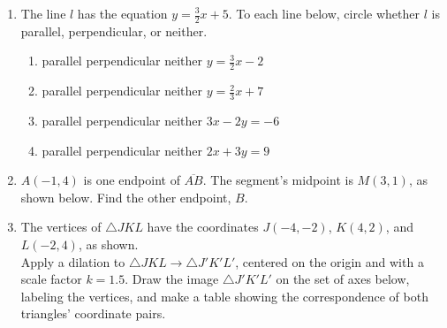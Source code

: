 \documentclass[12pt, twoside]{article}
\begin{document}
\begin{enumerate}
  \item The line $l$ has the equation $y=\frac{3}{2}x+5$. To each line below, circle whether $l$ is parallel, perpendicular, or neither.
    \begin{enumerate}
      \item parallel \quad perpendicular \quad neither \qquad $y=\frac{3}{2}x-2$
      \vspace{0.5cm}
      \item parallel \quad perpendicular \quad neither \qquad $y=\frac{2}{3}x+7$
      \vspace{0.5cm}
      \item parallel \quad perpendicular \quad neither \qquad $3x-2y=-6$
      \vspace{2cm}
      \item parallel \quad perpendicular \quad neither \qquad $2x+3y=9$
      \vspace{2cm}
    \end{enumerate}

  \item $A(-1,4)$ is one endpoint of $\overline{AB}$. The segment's midpoint is $M(3,1)$, as shown below. Find the other endpoint, $B$.
      \begin{flushright}
      \end{flushright}

\newpage
  \item The vertices of $\triangle JKL$ have the coordinates $J(-4,-2)$, $K(4,2)$, and $L(-2,4)$, as shown. \\[0.25cm]
    Apply a dilation to $\triangle JKL \rightarrow \triangle J'K'L'$, centered on the origin and with a scale factor $k=1.5$. Draw the image $\triangle J'K'L'$ on the set of axes below, labeling the vertices, and make a table showing the correspondence of both triangles' coordinate pairs.
      \begin{flushright}
      \end{flushright}


\end{enumerate}
\end{document}
